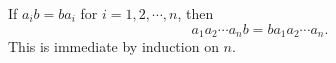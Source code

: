 If $a_i b = b a_i$ for $i = 1, 2, \cdots, n$, then
$$a_1 a_2 \cdots a_n b = b a_1 a_2 \cdots a_n.$$
This is immediate by induction on $n$.
